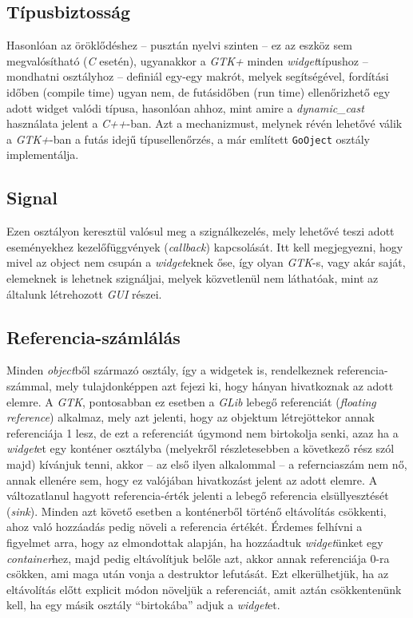 \subsection{Típusbiztosság}

Hasonlóan az öröklődéshez -- pusztán nyelvi szinten -- ez az eszköz sem megvalósítható (\textit{C} esetén), ugyanakkor a \textit{GTK+} minden \textit{widget}típushoz -- mondhatni osztályhoz -- definiál egy-egy makrót, melyek segítségével, fordítási időben (compile time) ugyan nem, de futásidőben (run time) ellenőrizhető egy adott widget valódi típusa, hasonlóan ahhoz, mint amire a \textit{dynamic\_cast} használata jelent a \textit{C++}-ban. Azt a mechanizmust, melynek révén lehetővé válik a \textit{GTK+}-ban a futás idejű típusellenőrzés, a már említett \texttt{GoOject} osztály implementálja.

\subsection{Signal}

Ezen osztályon keresztül valósul meg a szignálkezelés, mely lehetővé teszi adott eseményekhez kezelőfüggvények (\textit{callback}) kapcsolását. Itt kell megjegyezni, hogy mivel az object nem csupán a \textit{widget}eknek őse, így olyan \textit{GTK}-s, vagy akár saját, elemeknek is lehetnek szignáljai, melyek közvetlenül nem láthatóak, mint az általunk létrehozott \textit{GUI} részei.

\subsection{Referencia-számlálás}

Minden \textit{object}ből származó osztály, így a widgetek is, rendelkeznek referencia-számmal, mely tulajdonképpen azt fejezi ki, hogy hányan hivatkoznak az adott elemre. A \textit{GTK}, pontosabban ez esetben a \textit{GLib} lebegő referenciát (\textit{floating reference}) alkalmaz, mely azt jelenti, hogy az objektum létrejöttekor annak referenciája 1 lesz, de ezt a referenciát úgymond nem birtokolja senki, azaz ha a \textit{widget}et egy konténer osztályba (melyekről részletesebben a következő rész szól majd) kívánjuk tenni, akkor -- az első ilyen alkalommal -- a refernciaszám nem nő, annak ellenére sem, hogy ez valójában hivatkozást jelent az adott elemre. A változatlanul hagyott referencia-érték jelenti a lebegő referencia elsüllyesztését (\textit{sink}). Minden azt követő esetben a konténerből történő eltávolítás csökkenti, ahoz való hozzáadás pedig növeli a referencia értékét. Érdemes felhívni a figyelmet arra, hogy az elmondottak alapján, ha hozzáadtuk \textit{widget}ünket egy \textit{container}hez, majd pedig eltávolítjuk belőle azt, akkor annak referenciája 0-ra csökken, ami maga után vonja a destruktor lefutását. Ezt elkerülhetjük, ha az eltávolítás előtt explicit módon növeljük a referenciát, amit aztán csökkentenünk kell, ha egy másik osztály ``birtokába'' adjuk a \textit{widget}et.

